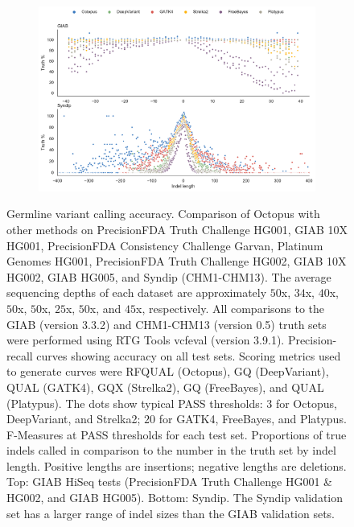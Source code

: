 \documentclass[notitlepage, twocolumn, 10pt]{article}
\begin{document}
\begin{figure}[ht!]
\begin{subfigure}[b]{0.49\textwidth}
        \includegraphics[width=\textwidth]{figures/germline_indels}
        \label{fig:germline:indels}
    \end{subfigure}
    \vspace{-0.5cm}
    \caption{Germline variant calling accuracy. Comparison of Octopus with other methods on PrecisionFDA Truth Challenge HG001, GIAB 10X HG001, PrecisionFDA Consistency Challenge Garvan, Platinum Genomes HG001, PrecisionFDA Truth Challenge HG002, GIAB 10X HG002, GIAB HG005, and Syndip (CHM1-CHM13). The average sequencing depths of each dataset are approximately $50$x, $34$x, $40$x, $50$x, $50$x, $25$x, $50$x, and $45$x, respectively. All comparisons to the GIAB (version 3.3.2) and CHM1-CHM13 (version 0.5) truth sets were performed using RTG Tools vcfeval (version 3.9.1). \protect{} Precision-recall curves showing accuracy on all test sets. Scoring metrics used to generate curves were RFQUAL (Octopus), GQ (DeepVariant), QUAL (GATK4), GQX (Strelka2), GQ (FreeBayes), and QUAL (Platypus). The dots show typical PASS thresholds: $3$ for Octopus, DeepVariant, and Strelka2; $20$ for GATK4, FreeBayes, and Platypus. \protect{} F-Measures at PASS thresholds for each test set. \protect{} Proportions of true indels called in comparison to the number in the truth set by indel length. Positive lengths are insertions; negative lengths are deletions. Top: GIAB HiSeq tests (PrecisionFDA Truth Challenge HG001 \& HG002, and GIAB HG005). Bottom: Syndip. The Syndip validation set has a larger range of indel sizes than the GIAB validation sets.}
    \label{fig:germline}
\end{figure}
\end{document}
